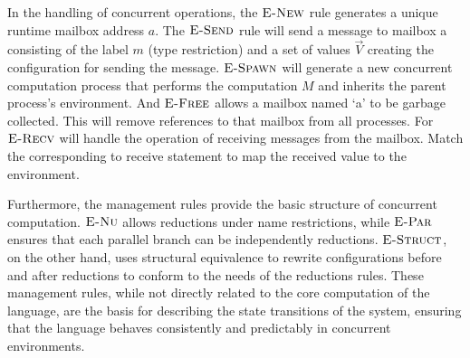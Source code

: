 \documentclass{l4proj}
\begin{document}
In the handling of concurrent operations, the $\textsc{E-New}$ rule generates a unique runtime mailbox address $a$. The $\textsc{E-Send}$ rule will send a message to mailbox a consisting of the label $m$ (type restriction) and a set of values $\overrightarrow{V}$ creating the configuration for sending the message. $\textsc{E-Spawn}$ will generate a new concurrent computation process that performs the computation $M$ and inherits the parent process's environment. And $\textsc{E-Free}$ allows a mailbox named `a' to be garbage collected. This will remove references to that mailbox from all processes. For $\textsc{E-Recv}$ will handle the operation of receiving messages from the mailbox. Match the corresponding to receive statement to map the received value to the environment.

Furthermore, the management rules provide the basic structure of concurrent computation. $\textsc{E-Nu}$ allows reductions under name restrictions, while $\textsc{E-Par}$ ensures that each parallel branch can be independently reductions. $\textsc{E-Struct}$, on the other hand, uses structural equivalence to rewrite configurations before and after reductions to conform to the needs of the reductions rules. These management rules, while not directly related to the core computation of the language, are the basis for describing the state transitions of the system, ensuring that the language behaves consistently and predictably in concurrent environments.
\end{document}
